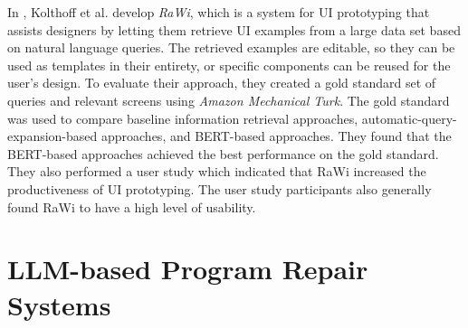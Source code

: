 \documentclass[11pt,titlepage,oneside,openany]{book}
\begin{document}
In \cite{kolthoff_data-driven_2023}, Kolthoff et al. develop \emph{RaWi}, which is a system for UI prototyping that assists designers by letting them retrieve UI examples from a large data set based on natural language queries. The retrieved examples are editable, so they can be used as templates in their entirety, or specific components can be reused for the user's design. To evaluate their approach, they created a gold standard set of queries and relevant screens using \emph{Amazon Mechanical Turk}. The gold standard was used to compare baseline information retrieval approaches, automatic-query-expansion-based approaches, and BERT-based approaches. They found that the BERT-based approaches achieved the best performance on the gold standard. They also performed a user study which indicated that RaWi increased the productiveness of UI prototyping. The user study participants also generally found RaWi to have a high level of usability. 

\section{LLM-based Program Repair Systems}\label{sec:repair}
	
\end{document}
